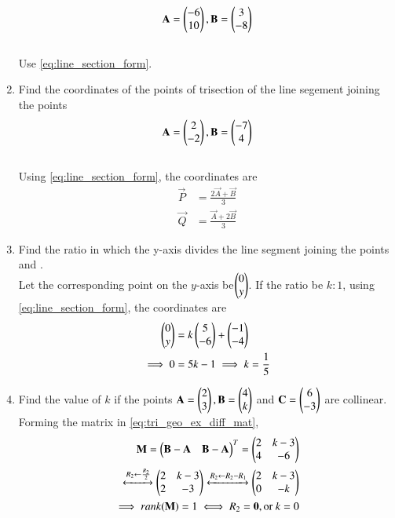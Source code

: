 \begin{enumerate}[label=\arabic*.,ref=\thesubsection.\theenumi]
\begin{align}
\mathbf{A} = \begin{pmatrix}-6\\10\end{pmatrix},
\mathbf{B} = \begin{pmatrix}3\\-8\end{pmatrix}
\end{align}
%
\\
\solution Use \eqref{eq:line_section_form}.
\item Find the coordinates of the points of trisection of the line segement joining the points
%
\begin{align}
\mathbf{A} = \begin{pmatrix}2\\-2\end{pmatrix},
\mathbf{B} = \begin{pmatrix}-7\\4\end{pmatrix}
\end{align}
%
\\
\solution Using \eqref{eq:line_section_form}, the coordinates are
%
\begin{align}
\label{eq:line_section_form_tri}
\vec{P} &= \frac{2 \vec{A} + \vec{B}}{3}
\\
\vec{Q} &= \frac{ \vec{A} + 2\vec{B}}{3}
\end{align}
%

\item Find the ratio in which the y-axis divides the line segment joining the points  and .
\\
\solution Let the corresponding point on the $y$-axis be$\begin{pmatrix}0\\y\end{pmatrix}$. If the ratio be $k:1$,
using \eqref{eq:line_section_form}, the coordinates are
%
\begin{align}
\begin{pmatrix}0\\y\end{pmatrix} &= k\begin{pmatrix}5\\-6\end{pmatrix}+ \begin{pmatrix}-1\\-4\end{pmatrix}
\\
\implies 0 &= 5k-1 \implies k = \frac{1}{5}
\end{align}
%


\item Find the value of $k$ if the points $\mathbf{A}=\begin{pmatrix}2\\3\end{pmatrix}, \mathbf{B}=\begin{pmatrix}4\\k\end{pmatrix}$ and $\mathbf{C}=\begin{pmatrix}6\\-3\end{pmatrix}$ are collinear.
\\
\solution Forming the matrix in \eqref{eq:tri_geo_ex_diff_mat},
\begin{align}
\mathbf{M} = \begin{pmatrix}\mathbf{B}-\mathbf{A} & \mathbf{B}-\mathbf{A}\end{pmatrix}^T 
= \begin{pmatrix}2 & k-3\\4 & -6\end{pmatrix}&
\\
\xleftrightarrow {R_2\leftarrow \frac{R_2}{2}}\begin{pmatrix}2 & k-3\\2 & -3\end{pmatrix}
\xleftrightarrow {R_2\leftarrow R_2-R_1}\begin{pmatrix}2 & k-3\\0 & -k\end{pmatrix}&
\\
\implies rank(\mathbf{M})= 1 \iff R_2 = \mathbf{0}, \text{or }k = 0 &
\end{align}


\end{enumerate}
